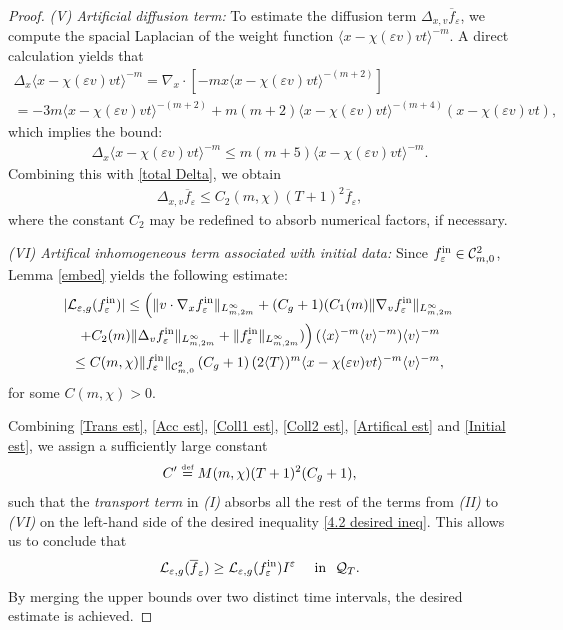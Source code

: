 \documentclass[reqno,11pt,final]{amsart}
\theoremstyle{plain}
\numberwithin{equation}{section}
\numberwithin{theorem}{section}
\newcommand{\eqdef }{\overset{\mbox{\tiny{def}}}{=}}
\begin{document}
\begin{proof}
\noindent \textit{(V) Artificial diffusion term:} To estimate the diffusion term $\Delta_{x,v}\overline{f}_\varepsilon$, we compute the spacial Laplacian of the weight function $\langle x-\chi(\varepsilon v)vt\rangle^{-m}$. A direct calculation yields that
\begin{multline*}
\Delta_x\langle x-\chi(\varepsilon v)vt\rangle^{-m} = \nabla_x\cdot[-mx\langle x-\chi(\varepsilon v)vt\rangle^{-(m+2)}]\\
= -3m\langle x-\chi(\varepsilon v)vt\rangle^{-(m+2)} +m(m+2)\langle x-\chi(\varepsilon v)vt\rangle^{-(m+4)}(x-\chi(\varepsilon v)vt),
\end{multline*}which implies the bound:
\begin{align*}
\Delta_x\langle x-\chi(\varepsilon v)vt\rangle^{-m} \le m(m+5)\langle x-\chi(\varepsilon v)vt\rangle^{-m}.
\end{align*}Combining this with  \eqref{total Delta}, we obtain
\begin{align}\label{Artifical est}
\Delta_{x,v}\overline{f}_\varepsilon \le C_2(m,\chi)(T+1)^2\overline{f}_\varepsilon,
\end{align}where the constant $C_2$ may be redefined to absorb numerical factors, if necessary. 

\noindent \textit{(VI) Artifical inhomogeneous term associated with initial data:} Since $f^\textup{in}_\varepsilon\in \mathcal{C}^2_{m,0}$, Lemma \ref{embed} yields the following estimate:
\begin{multline}\label{Initial est}
|\mathcal{L}_{\varepsilon,g}(f^\textup{in}_\varepsilon)| \le
\left(\lVert v\cdot\nabla_xf^\textup{in}_\varepsilon\rVert_{L^\infty_{m,2m}} + (C_g+1)(C_1(m) \lVert \nabla_vf^\textup{in}_\varepsilon\rVert_{L^\infty_{m,2m}}\right. \\
\left.+ C_2(m) \lVert \Delta_{v} f^\textup{in}_\varepsilon\rVert_{L^\infty_{m,2m}} + \lVert f^\textup{in}_\varepsilon\rVert_{L^\infty_{m,2m}})\right) (\langle x\rangle^{-m}\langle v\rangle^{-m})\langle v\rangle^{-m}\\
\le C(m,\chi)\lVert f^\textup{in}_\varepsilon\rVert_{\mathcal{C}^2_{m,0}}\left(C_g+1\right) (2\langle T\rangle)^m \langle x-\chi(\varepsilon v)vt\rangle^{-m}\langle v\rangle^{-m},
\end{multline}for some $C(m,\chi)>0.$

Combining \eqref{Trans est}, \eqref{Acc est}, \eqref{Coll1 est}, \eqref{Coll2 est}, \eqref{Artifical est} and \eqref{Initial est}, we assign a sufficiently large constant 
\begin{align}\label{final C'}
C' \eqdef M(m,\chi)(T+1)^2(C_g+1),
\end{align} such that the \textit{transport term} in \textit{(I)} absorbs all the rest of the terms from \textit{(II)} to \textit{(VI)} on the left-hand side of the desired inequality \eqref{4.2 desired ineq}. This allows us to conclude that
\begin{align*}
\mathcal{L}_{\varepsilon,g}(\overline{f}_\varepsilon) \ge \mathcal{L}_{\varepsilon,g}(f^\textup{in}_\varepsilon)I^\varepsilon \quad \textup{ in }\,\, \mathcal{Q}_T.
\end{align*}
By merging the upper bounds over two distinct time intervals, the desired estimate is achieved.


\end{proof}
\end{document}
